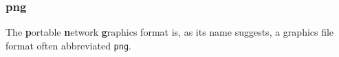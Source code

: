 \subsubsection{png}
The \textbf{p}ortable \textbf{n}etwork \textbf{g}raphics format is, as its name suggests, a graphics file
format often abbreviated \texttt{png}.




